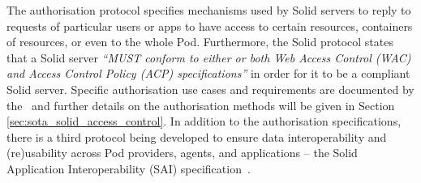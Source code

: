 The authorisation protocol specifies mechanisms used by Solid servers to reply to requests of particular users or apps to have access to certain resources, containers of resources, or even to the whole Pod.
Furthermore, the Solid protocol states that a Solid server \textit{``MUST conform to either or both Web Access Control (WAC) and Access Control Policy (ACP) specifications''} in order for it to be a compliant Solid server.
Specific authorisation use cases and requirements are documented by the~\cite{solid_editorial_team_use_2023} and further details on the authorisation methods will be given in Section \ref{sec:sota_solid_access_control}.
In addition to the authorisation specifications, there is a third protocol being developed to ensure data interoperability and (re)usability across Pod providers, agents, and applications -- the Solid Application Interoperability (SAI) specification~\citep{bingham_interop_2023}.

